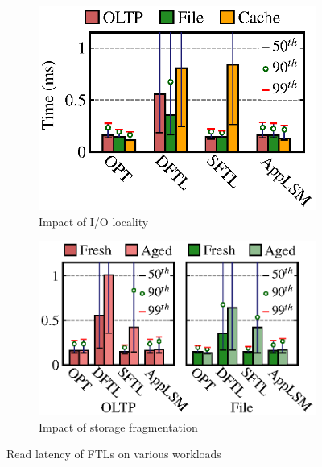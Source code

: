 \begin{figure}[t]
    \centering
    \begin{subfigure}[b]{0.218\textwidth}
        \centering
        \includegraphics[width=\textwidth]{exp/no-tp-intro-a.eps}
        \vspace{-13.5pt}
   	    \caption{Impact of I/O locality}
        \label{fig:long-avg}
    \end{subfigure}
    \begin{subfigure}[b]{0.252\textwidth}
        \centering
        \includegraphics[width=\textwidth]{exp/new-aged-intro.eps}
        \caption{Impact of storage fragmentation}
        \label{fig:aged-oltp}
    \end{subfigure}
    \vspace{-15pt}
        \caption{Read latency of FTLs on various workloads}
	\label{fig:moti}
\end{figure}

